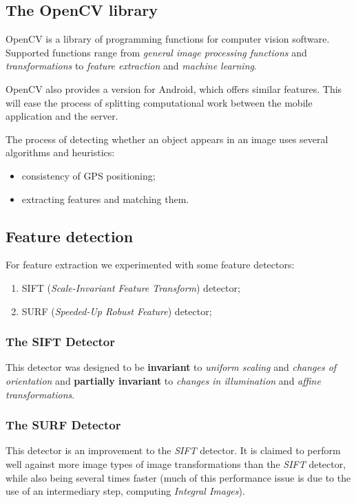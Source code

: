 \documentclass[a4paper,onecolumn,oneside,titlepage,12pt]{report}
\begin{document}
\subsection{The OpenCV library}
OpenCV is a library of programming functions for computer vision software. Supported functions range from \emph{general image processing functions} and \emph{transformations} to \emph{feature extraction} and \emph{machine learning}.

OpenCV also provides a version for Android, which offers similar features. This will ease the process of splitting computational work between the mobile application and the server.

The process of detecting whether an object appears in an image uses several algorithms and heuristics:
\begin{itemize}
	\item consistency of GPS positioning;
	\item extracting features and matching them.
\end{itemize}

\subsection{Feature detection}
For feature extraction we experimented with some feature detectors:
\begin{enumerate}
	\item SIFT (\emph{Scale-Invariant Feature Transform}) detector;
	\item SURF (\emph{Speeded-Up Robust Feature}) detector;
\end{enumerate}

\subsubsection{The SIFT Detector}
This detector was designed to be \textbf{invariant} to \emph{uniform scaling} and \emph{changes of orientation} and \textbf{partially invariant} to \emph{changes in illumination} and \emph{affine transformations}.

\subsubsection{The SURF Detector}
This detector is an improvement to the \emph{SIFT} detector. It is claimed to perform well against more image types of image transformations than the \emph{SIFT} detector, while also being several times faster (much of this performance issue is due to the use of an intermediary step, computing \emph{Integral Images}).
\end{document}
